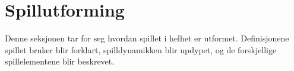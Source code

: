 \section{Spillutforming}\label{sec:design}
Denne seksjonen tar for seg hvordan spillet i helhet er utformet.
Definisjonene spillet bruker blir forklart, spilldynamikken blir updypet,
og de forskjellige spillelementene blir beskrevet.





